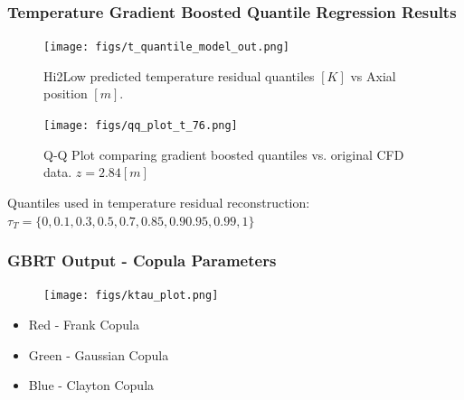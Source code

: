 \documentclass[t, pdftex]{beamer}
\begin{document}
\begin{frame}\frametitle{Temperature Gradient Boosted Quantile Regression Results}
    \begin{figure}
        \centering
        \begin{minipage}{.5\textwidth}
            \centering
            \texttt{[image: figs/t\_quantile\_model\_out.png]}
            \caption{Hi2Low predicted temperature residual quantiles $[K]$ vs Axial position $[m]$.}
        \end{minipage}%
        \begin{minipage}{.5\textwidth}
            \centering
            \texttt{[image: figs/qq\_plot\_t\_76.png]}
            \caption{Q-Q Plot comparing gradient boosted quantiles vs. original CFD data. $z=2.84[m]$}
        \end{minipage}
    \end{figure}
Quantiles used in temperature residual reconstruction: $\tau_{T}=\{0, 0.1, 0.3, 0.5, 0.7, 0.85, 0.9 0.95, 0.99, 1\}$
\end{frame}

\begin{frame}\frametitle{GBRT Output - Copula Parameters}
\begin{figure}[!htbp]
\centering
\texttt{[image: figs/ktau\_plot.png]}
\label{model_overview}
\end{figure}
\begin{itemize}
\item Red - Frank Copula
\item Green - Gaussian Copula
\item Blue - Clayton Copula
\end{itemize}
\end{frame}



\end{document}
